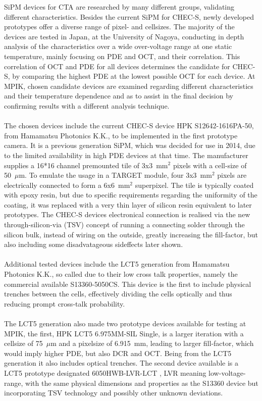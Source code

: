 \documentclass[12pt,article,type=msc,colorback,accentcolor=tud9c]{tudthesis}
\begin{document}
\noindent SiPM devices for CTA are researched by many different groups, validating different characteristics. Besides the current SiPM for CHEC-S, newly developed prototypes offer a diverse range of pixel- and cellsizes. The majority of the devices are tested in Japan, at the University of Nagoya, conducting in depth analysis of the characteristics over a wide over-voltage range at one static temperature, mainly focusing on PDE and OCT, and their correlation. This correlation of OCT and PDE for all devices determines the candidate for CHEC-S, by comparing the highest PDE at the lowest possible OCT for each device. At MPIK, chosen candidate devices are examined regarding different characteristics and their temperature dependence and as to assist in the final decision by confirming results with a different analysis technique.\\\\
The chosen devices include the current CHEC-S device HPK S12642-1616PA-50, from Hamamatsu Photonics K.K., to be implemented in the first prototype camera. It is a previous generation SiPM, which was decided for use in 2014, due to the limited availability in high PDE devices at that time. The manufacturer supplies a 16*16 channel premounted tile of 3x3~mm$^2$ pixels with a cell-size of 50~$\mu$m. To emulate the usage in a TARGET module, four 3x3~mm$^2$ pixels are electrically connected to form a 6x6~mm$^2$ superpixel. The tile is typically coated with epoxy resin, but due to specific requirements regarding the uniformity of the coating, it was replaced with a very thin layer of silicon resin equivalent to later prototypes. The CHEC-S devices electronical connection is realised via the new through-silicon-via (TSV) concept of running a connecting solder through the silicon bulk, instead of wiring on the outside, greatly increasing the fill-factor, but also including some disadvatageous sideffects later shown.\\\\
Additional tested devices include the LCT5 generation from Hamamatsu Photonics K.K., so called due to their low cross talk properties, namely the commercial available S13360-5050CS. This device is the first to include physical trenches between the cells, effectively dividing the cells optically and thus reducing prompt cross-talk probability.\\\\
The LCT5 generation also made two prototype devices available for testing at MPIK, the first, HPK LCT5 6.975MM-SIL Single, is a larger iteration with a cellsize of 75~$\mu$m and a pixelsize of 6.915~mm, leading to larger fill-factor, which would imply higher PDE, but also DCR and OCT. Being from the LCT5 generation it also includes optical trenches. The second device available is a LCT5 prototype designated 6050HWB-LVR-LCT , LVR meaning low-voltage-range, with the same physical dimensions and properties as the S13360 device but incorporating TSV technology and possibly other unknown deviations.\\\\
\end{document}
